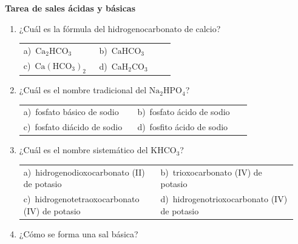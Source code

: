 \documentclass[11pt,a4paper]{article}
\begin{document}
{\Large\bfseries Tarea de sales ácidas y básicas}
\vspace{12pt}
\begin{enumerate}[label=\textbf{\arabic*.},leftmargin=*,itemsep=11pt,topsep=0pt]
\item \begin{minipage}[t]{\linewidth}
¿Cuál es la fórmula del hidrogenocarbonato de calcio?

\vspace{5pt}
\begin{tabular}{@{}p{0.47\linewidth}p{0.47\linewidth}@{}}
a)~$\mathrm{Ca_{2}HCO_{3}}$ & b)~$\mathrm{CaHCO_{3}}$ \\
c)~$\mathrm{Ca(HCO_{3})_{2}}$ & d)~$\mathrm{CaH_{2}CO_{3}}$ \\
\end{tabular}
\end{minipage}

\item \begin{minipage}[t]{\linewidth}
¿Cuál es el nombre tradicional del $\mathrm{Na_{2}HPO_{4}}$?

\vspace{5pt}
\begin{tabular}{@{}p{0.47\linewidth}p{0.47\linewidth}@{}}
a)~fosfato básico de sodio & b)~fosfato ácido de sodio \\
c)~fosfato diácido de sodio & d)~fosfito ácido de sodio \\
\end{tabular}
\end{minipage}

\item \begin{minipage}[t]{\linewidth}
¿Cuál es el nombre sistemático del $\mathrm{KHCO_{3}}$?

\vspace{5pt}
\begin{tabular}{@{}p{0.47\linewidth}p{0.47\linewidth}@{}}
a)~hidrogenodioxocarbonato (II) de potasio & b)~trioxocarbonato (IV) de potasio \\
c)~hidrogenotetraoxocarbonato (IV) de potasio & d)~hidrogenotrioxocarbonato (IV) de potasio \\
\end{tabular}
\end{minipage}

\item \begin{minipage}[t]{\linewidth}
¿Cómo se forma una sal básica?


\end{minipage}
\end{enumerate}
\end{document}
